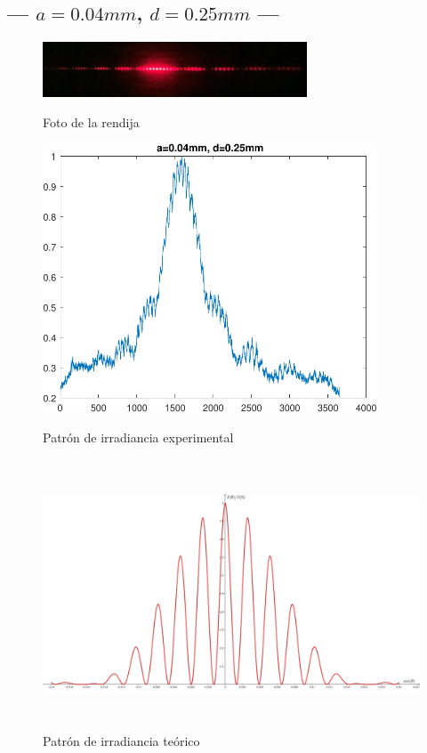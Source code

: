 \documentclass[12pt,a4paper]{article}
\begin{document}
	\subsection{--- \(a=0.04mm\), \(d=0.25mm\) ---} %
	\label{sub:a_bajo_d_bajo}
	\begin{figure}[htbp!]
		\centering
		\includegraphics[width=0.7\textwidth]{3_RESUL/04_y_25.jpg}
		\caption{Foto de la rendija}
		\label{fig:A1}
		\includegraphics[width=0.7\linewidth,height=8cm]{3_RESUL/04_y_25.pdf}
		\caption{Patrón de irradiancia experimental}
		\label{fig:A2}
		\includegraphics[width=0.7\linewidth,height=8cm]{3_RESUL/Irradiancia 1.png}
		\caption{Patrón de irradiancia teórico}
		\label{fig:A3}
	\end{figure}
\end{document}
